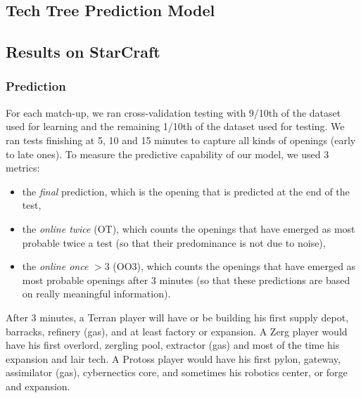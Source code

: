 \subsection{Tech Tree Prediction Model}
\label{sec:techtreepred}

\subsection{Results on StarCraft}


\subsubsection{Prediction}

For each match-up, we ran cross-validation testing with 9/10th of the dataset used for learning and the remaining 1/10th of the dataset used for testing. We ran tests finishing at 5, 10 and 15 minutes to capture all kinds of openings (early to late ones). To measure the predictive capability of our model, we used 3 metrics: 
\begin{itemize}
\item the \textit{final} prediction, which is the opening that is predicted at the end of the test, 
\item the \textit{online twice} (OT), which counts the openings that have emerged as most probable twice a test (so that their predominance is not due to noise),
\item the \textit{online once} $> 3$ (OO3), which counts the openings that have emerged as most probable openings after 3 minutes (so that these predictions are based on really meaningful information).
\end{itemize}
After 3 minutes, a Terran player will have or be building his first supply depot, barracks, refinery (gas), and at least factory or expansion. A Zerg player would have his first overlord, zergling pool, extractor (gas) and most of the time his expansion and lair tech. A Protoss player would have his first pylon, gateway, assimilator (gas), cybernectics core, and sometimes his robotics center, or forge and expansion.

